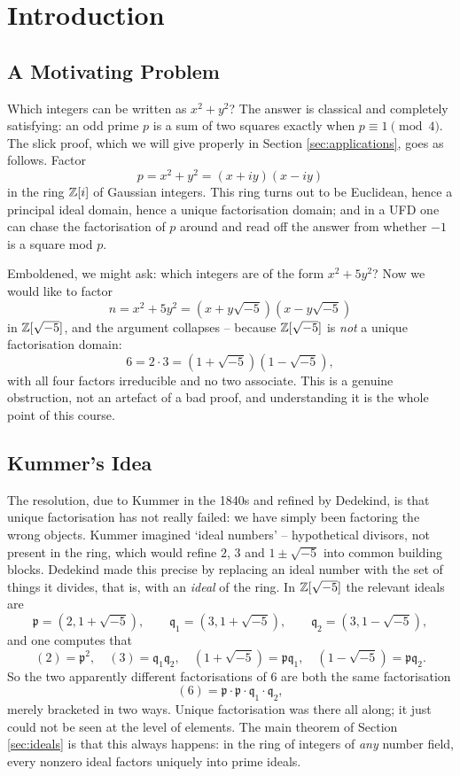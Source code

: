 \documentclass[a4paper]{scrartcl}
\newcommand{\fp}{\mathfrak{p}}
\newcommand{\fq}{\mathfrak{q}}
\begin{document}
\tableofcontents

\section{Introduction}

\subsection{A Motivating Problem}

Which integers can be written as $x^2+y^2$? The answer is classical and completely satisfying: an odd prime $p$ is a sum of two squares exactly when $p \equiv 1 \pmod 4$. The slick proof, which we will give properly in Section \ref{sec:applications}, goes as follows. Factor
$$p = x^2+y^2 = (x+iy)(x-iy)$$
in the ring $\mathbb{Z}[i]$ of Gaussian integers. This ring turns out to be Euclidean, hence a principal ideal domain, hence a unique factorisation domain; and in a UFD one can chase the factorisation of $p$ around and read off the answer from whether $-1$ is a square mod $p$.

Emboldened, we might ask: which integers are of the form $x^2+5y^2$? Now we would like to factor
$$n = x^2+5y^2 = \left(x+y\sqrt{-5}\right)\left(x-y\sqrt{-5}\right)$$
in $\mathbb{Z}[\sqrt{-5}]$, and the argument collapses -- because $\mathbb{Z}[\sqrt{-5}]$ is \emph{not} a unique factorisation domain:
$$6 = 2 \cdot 3 = \left(1+\sqrt{-5}\right)\left(1-\sqrt{-5}\right),$$
with all four factors irreducible and no two associate. This is a genuine obstruction, not an artefact of a bad proof, and understanding it is the whole point of this course.

\subsection{Kummer's Idea}

The resolution, due to Kummer in the 1840s and refined by Dedekind, is that unique factorisation has not really failed: we have simply been factoring the wrong objects. Kummer imagined `ideal numbers' -- hypothetical divisors, not present in the ring, which would refine $2$, $3$ and $1\pm\sqrt{-5}$ into common building blocks. Dedekind made this precise by replacing an ideal number with the set of things it divides, that is, with an \emph{ideal} of the ring. In $\mathbb{Z}[\sqrt{-5}]$ the relevant ideals are
$$\fp = \left(2, 1+\sqrt{-5}\right), \qquad \fq_1 = \left(3,1+\sqrt{-5}\right), \qquad \fq_2 = \left(3, 1-\sqrt{-5}\right),$$
and one computes that
$$(2) = \fp^2, \quad (3) = \fq_1\fq_2, \quad \left(1+\sqrt{-5}\right) = \fp\fq_1, \quad \left(1-\sqrt{-5}\right) = \fp\fq_2.$$
So the two apparently different factorisations of $6$ are both the same factorisation
$$(6) = \fp\cdot\fp\cdot\fq_1\cdot\fq_2,$$
merely bracketed in two ways. Unique factorisation was there all along; it just could not be seen at the level of elements. The main theorem of Section \ref{sec:ideals} is that this always happens: in the ring of integers of \emph{any} number field, every nonzero ideal factors uniquely into prime ideals.
\end{document}
